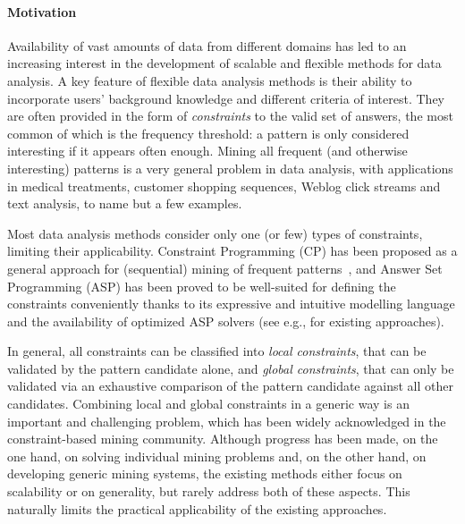 \paragraph{Motivation} 
Availability of vast amounts of data from different domains has led to an increasing interest in the development of scalable and flexible methods for data analysis.
A key feature of flexible data analysis methods is their ability to incorporate users' background knowledge and different criteria of interest. They are often provided in the form of \emph{constraints} to the valid set of answers, the most common of which is the frequency threshold: a pattern is only considered interesting if it appears often enough. Mining all frequent (and otherwise interesting) patterns is a very general problem in data analysis, with applications in medical treatments, customer shopping sequences, Weblog click streams and text analysis, to name but a few examples.

Most data analysis methods consider only one (or few) types of constraints, limiting their applicability. Constraint Programming (CP) has been proposed as a general approach for (sequential) mining of frequent patterns~\parencite{DBLP:books/mit/fayyadPSU96/AgrawalMSTV96}, and Answer Set Programming (ASP) \parencite{GL1988} has been proved to be well-suited for defining the constraints conveniently thanks to its expressive and intuitive modelling language and the availability of optimized ASP solvers (see e.g., \parencite{DBLP:conf/lpnmr/Jarvisalo11,DBLP:conf/ijcai/GebserGQ0S16,DBLP:journals/corr/GuyetMQ14} for existing approaches). 


In general, all constraints can be classified into \emph{local constraints}, that can be validated by the pattern candidate alone, and \emph{global constraints}, that can only be validated via an exhaustive comparison of the pattern candidate against all other candidates. Combining local and global constraints in a generic way is an important and challenging problem, which has been widely acknowledged in the constraint-based mining community.  Although progress has been made, on the one hand, on solving individual mining problems and, on the other hand, on developing generic mining systems, the existing methods either focus on scalability or on generality, but rarely address both of these aspects. This naturally limits the practical applicability of the existing approaches.


